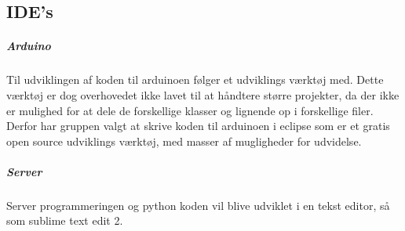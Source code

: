 \subsection*{IDE's}

\subparagraph*{Arduino}
Til udviklingen af koden til arduinoen følger et udviklings værktøj med. Dette værktøj er dog overhovedet ikke lavet til at håndtere større projekter, da der ikke er mulighed for at dele de forskellige klasser og lignende op i forskellige filer. Derfor har gruppen valgt at skrive koden til arduinoen i eclipse som er et gratis open source udviklings værktøj, med masser af mugligheder for udvidelse.

\subparagraph*{Server}
Server programmeringen og python koden vil blive udviklet i en tekst editor, så som sublime text edit 2.  